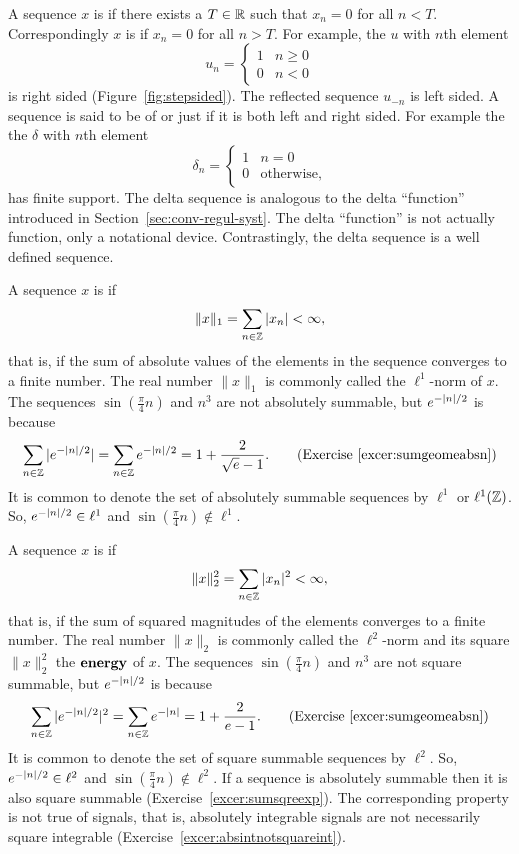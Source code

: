 A sequence $x$ is  if there exists a $T \in {\mathbb R}$ such that $x_n = 0$ for all $n < T$.  Correspondingly $x$ is  if $x_n = 0$ for all $n > T$.  For example, the  $u$ with $n$th element 
\begin{equation} \label{eq:stepsequence}
u_n = \begin{cases} 
1 & n \geq 0 \\
0 & n < 0 
\end{cases}
\end{equation}
is right sided  (Figure~\ref{fig:stepsided}).  The reflected sequence $u_{-n}$ is left sided.  A sequence is said to be of  or just  if it is both left and right sided.  For example the the  $\delta$ with $n$th element 
\begin{equation} \label{eq:deltasequence}
\delta_n = \begin{cases}
1 & n = 0 \\
0 & \text{otherwise},
\end{cases}
\end{equation}
has finite support.  The delta sequence is analogous to the delta ``function'' introduced in Section~\ref{sec:conv-regul-syst}.  The delta ``function'' is not actually function, only a notational device.  Contrastingly, the delta sequence is a well defined sequence.

A sequence $x$ is  if
\[
\|x\|_1 = \sum_{n \in {\mathbb Z}} \vert x_n \vert < \infty,
\]
that is, if the sum of absolute values of the elements in the sequence converges to a finite number.  The real number $\|x\|_1$ is commonly called the $\ell^1$-norm of $x$.  The sequences $\sin(\tfrac{\pi}{4} n)$ and $n^3$ are not absolutely summable, but $e^{-\left\vert n \right\vert/2}$ is because
\[
\sum_{n \in {\mathbb Z}} \vert e^{-\vert n \vert/2} \vert = \sum_{n \in {\mathbb Z}} e^{-\vert n \vert/2} = 1 + \frac{2}{\sqrt{e} - 1}. \qquad \text{(Exercise~\ref{excer:sumgeomeabsn})}
\]
It is common to denote the set of absolutely summable sequences by $\ell^1$ or $\ell^1({\mathbb Z})$.  So, $e^{-\vert n \vert/2} \in \ell^1$ and $\sin(\tfrac{\pi}{4} n) \notin \ell^1$.

A sequence $x$ is  if
\[
\|x\|_2^2 = \sum_{n \in {\mathbb Z}} \vert x_n \vert^2 < \infty,
\]
that is, if the sum of squared magnitudes of the elements converges to a finite number.  The real number $\|x\|_2$ is commonly called the $\ell^2$-norm and its square $\|x\|^2_2$ the $\textbf{energy}$ of $x$.  The sequences $\sin(\tfrac{\pi}{4} n)$ and $n^3$ are not square summable, but $e^{-\left\vert n \right\vert/2}$ is because 
\[
\sum_{n \in {\mathbb Z}} \vert e^{-\vert n \vert/2} \vert^2 = \sum_{n \in {\mathbb Z}} e^{-\left\vert n \right\vert} = 1 + \frac{2}{e - 1}. \qquad \text{(Exercise~\ref{excer:sumgeomeabsn})}
\]
It is common to denote the set of square summable sequences by $\ell^2$.  So, $e^{-\vert n \vert/2} \in \ell^2$ and $\sin(\tfrac{\pi}{4} n) \notin \ell^2$.  If a sequence is absolutely summable then it is also square summable (Exercise~\ref{excer:sumsqreexp}).  The corresponding property is not true of signals, that is, absolutely integrable signals are not necessarily square integrable (Exercise~\ref{excer:absintnotsquareint}).



